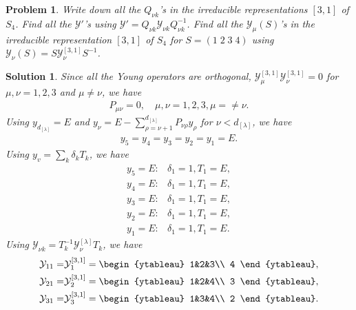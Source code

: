 \documentclass[UTF8,10pt,a4paper]{article}
\theoremstyle{Problem}
\newtheorem{prob}{Problem}
\theoremstyle{Solution}
\newtheorem*{sol}{Solution}
\begin{document}
\begin{prob}
    Write down all the $Q_{\nu k}$'s in the irreducible representations $[3,1]$ of $S_4$. Find all the $\mathcal{Y}'$'s using $\mathcal{Y}'=Q_{\nu k}\mathcal{Y}_{\nu k}Q_{\nu k}^{-1}$. Find all the $\mathcal{Y}_{\mu}(S)$'s in the irreducible representation $[3,1]$ of $S_4$ for $S=(1\;2\;3\;4)$ using $\mathcal{Y}_{\nu}(S)=S\mathcal{Y}_{\nu}^{[3,1]}S^{-1}$.
\end{prob}
\begin{sol}
    Since all the Young operators are orthogonal, $\mathcal{Y}_{\mu}^{[3,1]}\mathcal{Y}_{\nu}^{[3,1]}=0$ for $\mu,\nu=1,2,3$ and $\mu\neq\nu$, we have
    \begin{align}
        P_{\mu\nu}=0,\quad\mu,\nu=1,2,3,\mu=\neq\nu.
    \end{align}
    Using $y_{d_{[\lambda]}}=E$ and $y_{\nu}=E-\sum_{\rho=\nu+1}^{d_{[\lambda]}}P_{\nu\rho}y_{\rho}$ for $\nu<d_{[\lambda]}$, we have
    \begin{align}
        y_5=y_4=y_3=y_2=y_1=E.
    \end{align}
    Using $y_v=\sum_k\delta_kT_k$, we have
    \begin{align}
        y_5=E:&\delta_1=1,T_1=E,\\
        y_4=E:&\delta_1=1,T_1=E,\\
        y_3=E:&\delta_1=1,T_1=E,\\
        y_2=E:&\delta_1=1,T_1=E,\\
        y_1=E:&\delta_1=1,T_1=E.
    \end{align}
    Using $\mathcal{Y}_{\nu k}=T_k^{-1}\mathcal{Y}_{\nu}^{[\lambda]}T_k$, we have
    \begin{align}
        \mathcal{Y}_{11}=&\mathcal{Y}_{1}^{[3,1]}=\begin{ytableau}
            1&2&3\\
            4
        \end{ytableau},\\
        \mathcal{Y}_{21}=&\mathcal{Y}_{2}^{[3,1]}=\begin{ytableau}
            1&2&4\\
            3
        \end{ytableau},\\
        \mathcal{Y}_{31}=&\mathcal{Y}_{3}^{[3,1]}=\begin{ytableau}
            1&3&4\\
            2
        \end{ytableau}.
    \end{align}

\end{sol}
\end{document}
